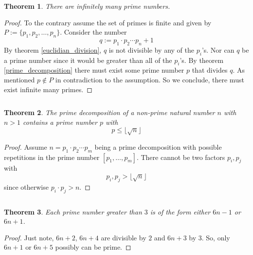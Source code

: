 \documentclass[17pt]{extarticle}
\newtheorem{theorem}{Theorem}
\begin{document}
$ $\newline
\begin{theorem}
	There are infinitely many prime numbers.
\end{theorem}
\begin{proof}
	To the contrary assume the set of primes is finite and given by $P:=\{p_1, p_2, \dots, p_n\}$.
	Consider the number 
	$$q:=p_1\cdot p_2 \cdots p_n + 1$$
	By theorem \ref{euclidian_division}, $q$ is not divisible by any of the $p_i$'s. Nor can $q$ be a prime number since it would be greater than all of the $p_i$'s. By theorem \ref{prime_decomposition} there must exist some prime number $p$ that divides $q$. As mentioned $p\notin P$ in contradiction to the assumption. So we conclude, there must exist infinite many primes.
\end{proof}
$ $\newline
\begin{theorem}
	The prime decomposition of a non-prime natural number $n$ with $n>1$ contains a prime number $p$ with
	$$p\leq \lfloor \sqrt{n} \rfloor$$
\end{theorem}
\begin{proof}
	Assume $n=p_1\cdot p_2 \cdots p_m$ being a prime decomposition with possible repetitions in
	the prime number $[p_1, \dots, p_m]$. There cannot be two factors $p_i, p_j$ with 
	$$p_i, p_j > \lfloor \sqrt{n} \rfloor$$
	since otherwise $p_i\cdot p_j > n$.
\end{proof}
$ $\newline
\begin{theorem}
Each prime number greater than $3$ is of the form either $6n-1$ or $6n+1$.	
\end{theorem}
\begin{proof}
	Just note, $6n+2$, $6n+4$ are divisible by $2$ and $6n+3$ by $3$.
	So, only $6n+1$ or $6n+5$ possibly can be prime.
\end{proof}
\end{document}
